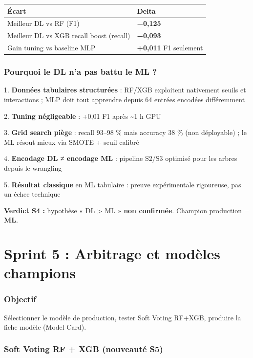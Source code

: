 \documentclass[11pt,a4paper]{report}
\begin{document}
{\small
\begin{longtable}{@{}>{\raggedright\arraybackslash}p{}>{\raggedright\arraybackslash}p{}@{}}
\toprule
\rowcolor{EHTPTableHead}Écart & Delta \\
\midrule
Meilleur DL vs RF (F1) & \textbf{−0,125} \\
Meilleur DL vs XGB recall boost (recall) & \textbf{−0,093} \\
Gain tuning vs baseline MLP & \textbf{+0,011} F1 seulement \\
\bottomrule
\end{longtable}
}

\subsection{Pourquoi le DL n'a pas battu le ML ?}

1. \textbf{Données tabulaires structurées} : RF/XGB exploitent nativement seuils et interactions ; MLP doit tout apprendre depuis 64 entrées encodées différemment

2. \textbf{Tuning négligeable} : +0,01 F1 après \textasciitilde{}1 h GPU

3. \textbf{Grid search piège} : recall 93–98 \% mais accuracy 38 \% (non déployable) ; le ML résout mieux via SMOTE + seuil calibré

4. \textbf{Encodage DL ≠ encodage ML} : pipeline S2/S3 optimisé pour les arbres depuis le wrangling

5. \textbf{Résultat classique} en ML tabulaire : preuve expérimentale rigoureuse, pas un échec technique

\textbf{Verdict S4 :} hypothèse « DL > ML » \textbf{non confirmée}. Champion production = \textbf{ML}.

\clearpage

\chapter[Sprint 5]{Sprint 5 : Arbitrage et modèles champions}

\label{ch:sprint5}

\subsection{Objectif}

Sélectionner le modèle de production, tester Soft Voting RF+XGB, produire la fiche modèle (Model Card).

\subsection{Soft Voting RF + XGB (nouveauté S5)}
\end{document}
